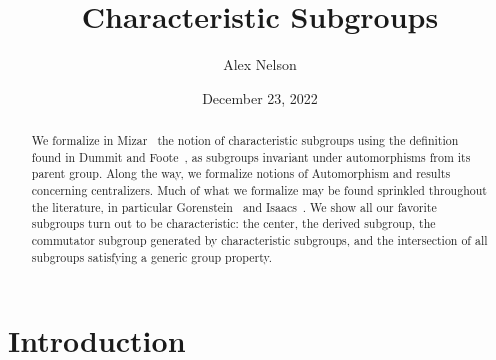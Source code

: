 \documentclass{amsart}
\title{Characteristic Subgroups}
\author{Alex Nelson}
\date{December 23, 2022}
\begin{document}

\begin{abstract}
We formalize in Mizar~\cite{bancerek2015mizar,bancerek2018role} the
notion of characteristic subgroups using the definition found in Dummit
and Foote~\cite{dummit-foote}, as subgroups invariant under
automorphisms from its parent group. Along the way, we formalize notions
of Automorphism and results concerning centralizers. Much of what we
formalize may be found sprinkled throughout the literature, in
particular Gorenstein~\cite{gorenstein1980finite} and
Isaacs~\cite{isaacs2008finite}. We show all our favorite subgroups turn
out to be characteristic: the center, the derived subgroup, the
commutator subgroup generated by characteristic subgroups, and the
intersection of all subgroups satisfying a generic group property.
\end{abstract}

\maketitle

\tableofcontents

\section*{Introduction}




\clearpage
{}
\printindices
\end{document}
